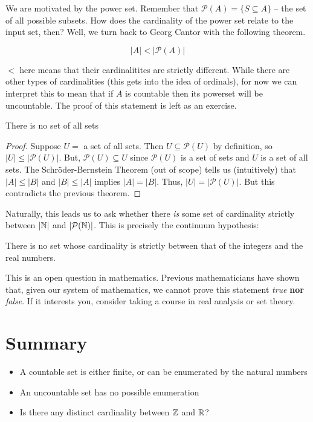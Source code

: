 \documentclass[main.tex]{subfiles}
\begin{document}
We are motivated by the power set.
Remember that \(\mathcal{P}(A) = \{ S \subseteq A \}\) -- the set of all possible subsets.
How does the cardinality of the power set relate to the input set, then?
Well, we turn back to Georg Cantor with the following theorem.

\begin{thm}
	\[|A| < |\mathcal{P}(A)|\]
\end{thm}

\(<\) here means that their cardinalitites are strictly different.
While there are other types of cardinalities (this gets into the idea of ordinals), for now we can interpret this to mean that if \(A\) is countable then its powerset will be uncountable.
The proof of this statement is left as an exercise.

\begin{thm}
	There is no set of all sets
\end{thm}

\begin{proof}
	Suppose \(U = \) a set of all sets.
	Then \(U \subseteq \mathcal{P}(U)\) by definition, so \(|U| \leq |\mathcal{P}(U)|\).
	But, \(\mathcal{P}(U) \subseteq U\) since \(\mathcal{P}(U)\) is a set of sets and \(U\) is a set of all sets.
	The Schr\"{o}der-Bernstein Theorem (out of scope) tells us (intuitively) that \(|A| \leq |B|\) and \(|B| \leq |A|\) implies \(|A| = |B|\).
	Thus, \(|U| = |\mathcal{P}(U)|\).
	But this contradicts the previous theorem.
\end{proof}

Naturally, this leads us to ask whether there \textit{is} some set of cardinality strictly between \(|\mathbb{N}|\) and \(|\mathcal{P}(\mathbb{N})|\).
This is precisely the continuum hypothesis:
\begin{center}
	There is no set whose cardinality is strictly between that of the integers and the real numbers.
\end{center}
This is an open question in mathematics.
Previous mathematicians have shown that, given our system of mathematics, we cannot prove this statement \textit{true} \textbf{nor} \textit{false}.
If it interests you, consider taking a course in real analysis or set theory.

\section{Summary}

\begin{itemize}
	\item A countable set is either finite, or can be enumerated by the natural numbers
	\item An uncountable set has no possible enumeration
	\item Is there any distinct cardinality between \(\mathbb{Z}\) and \(\mathbb{R}\)?
\end{itemize}
\end{document}
